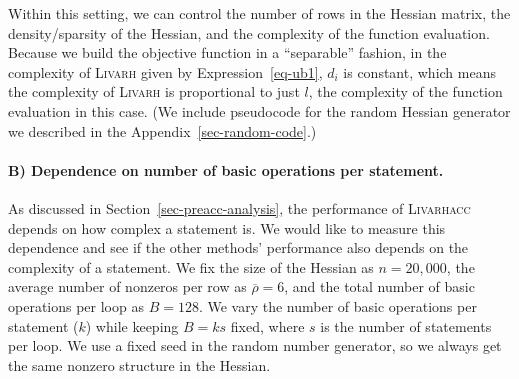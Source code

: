 \documentclass[12pt]{article}
\begin{document}
Within this setting, we can control the number of rows in the Hessian matrix, the density/sparsity of the Hessian, and the complexity of the function evaluation. Because we build
the objective function in a ``separable'' fashion, in the complexity of 
\textsc{Livarh} given by Expression~\eqref{eq-ub1}, $d_i$ is constant, which means the complexity of \textsc{Livarh} is proportional to just $l$, the complexity of the function 
evaluation in this case.
(We include pseudocode for the random Hessian generator we described in the Appendix~\ref{sec-random-code}.)   


\paragraph{B) Dependence on number of basic operations per statement.}

As discussed in Section~\ref{sec-preacc-analysis}, the performance of \textsc{Livarhacc} depends on how complex a statement is. We would like to measure this dependence
and see if the other methods' performance also depends on the complexity of a statement. We fix the size of the Hessian as $n=20,000$, the average number of nonzeros per row as $\overline{\rho} = 6$, and the total number of basic operations per loop as $B=128$.
We vary the number of basic operations per statement ($k$) while keeping $B=k s$ fixed, where $s$ is the number of statements per loop. We use a fixed seed in the random number generator,
so we always get the same nonzero structure in the Hessian. 
\end{document}
